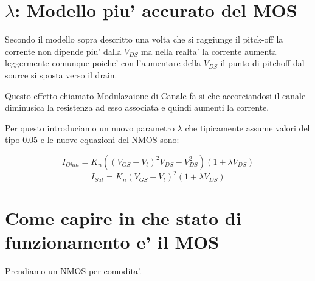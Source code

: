 \documentclass[\main/main.tex]{subfiles}
\begin{document}
\clearpage
\section{$\lambda$: Modello piu' accurato del MOS}

Secondo il modello sopra descritto una volta che si raggiunge il pitck-off la corrente non dipende piu' dalla $V_{DS}$ ma nella realta' la corrente aumenta leggermente comunque poiche' con l'aumentare della $V_{DS}$ il punto di pitchoff dal source si sposta verso il drain.

Questo effetto chiamato Modulazaione di Canale fa si che accorciandosi il canale diminusica la resistenza ad esso associata e quindi aumenti la corrente.

Per questo introduciamo un nuovo parametro $\lambda$ che tipicamente assume valori del tipo $0.05$ e le nuove equazioni del NMOS sono:

\[ I_{Ohm} = K_n \left( (V_{GS} - V_t)^2 V_{DS} - V_{DS}^2 \right)(1+\lambda V_{DS})\]
\[ I_{Sat} = K_n \left( V_{GS} - V_t \right)^2(1+\lambda V_{DS})\]

\begin{figure}[H]
	\center
\end{figure}

\clearpage
\section{Come capire in che stato di funzionamento e' il MOS}
Prendiamo un NMOS per comodita'.
\end{document}

